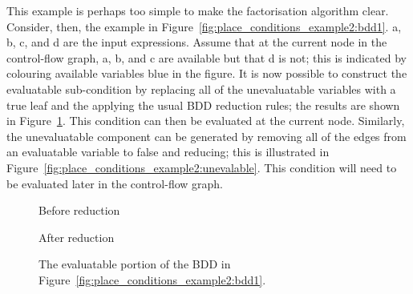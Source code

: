 This example is perhaps too simple to make the factorisation algorithm
clear.  Consider, then, the example in
Figure~\ref{fig:place_conditions_example2:bdd1}.  a, b, c, and d are
the input expressions.  Assume that at the current node in the
control-flow graph, a, b, and c are available but that d is not; this
is indicated by colouring available variables blue in the figure.  It
is now possible to construct the evaluatable sub-condition by
replacing all of the unevaluatable variables with a true leaf and the
applying the usual BDD reduction rules; the results are shown in
Figure~\ref{fig:place_conditions_example2:evalable}.  This condition
can then be evaluated at the current node.  Similarly, the
unevaluatable component can be generated by removing all of the edges
from an evaluatable variable to false and reducing; this is
illustrated in Figure~\ref{fig:place_conditions_example2:unevalable}.
This condition will need to be evaluated later in the control-flow
graph.


\begin{figure}
  {\hfill}
  \begin{subfloat}
    \caption{Before reduction}
  \end{subfloat}
  {\hfill}
  \begin{subfloat}
    \caption{After reduction}
  \end{subfloat}
  {\hfill}
  \caption{The evaluatable portion of the BDD in
    Figure~\ref{fig:place_conditions_example2:bdd1}.}
  \label{fig:place_conditions_example2:evalable}
\end{figure}

